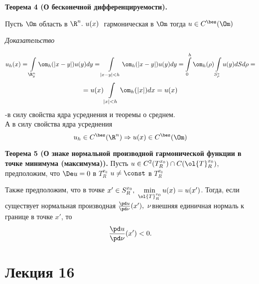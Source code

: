 \documentclass[a4paper,draft]{article}
\begin{document}
\textbf{Теорема 4 (О бесконечной дифференцируемости).}

Пусть $\Om$ область в $\R^n.\ u(x)\ $ гармоническая в $\Om$
тогда $u\in C^\bes(\Om)$

\textit{Доказательство}

$$
u_h(x)=\int\limits_{\R_y^n}\om_h(|x-y|)u(y)dy=
\int\limits_{|x-y|<h}\om_h(|x-y|)u(y)dy=
\int\limits_0^h\om_h(\rho)\int\limits_{S_\rho^x}u(y)dSd\rho=
$$
$$
=u(x)\int\limits_{|x|<h}\om_h(|x|)dx=u(x)
$$
-в силу свойства ядра усреднения и теоремы о среднем.\\
А в силу свойства ядра усреднения
$$
u_h\in C^\bes(\R^n)\Rightarrow u(x)\in C^\bes(\Om)
$$

\textbf{Теорема 5 (О знаке нормальной производной гармонической функции в точке минимума (максимума)).}
Пусть $u\in C^2(T_R^{x_0})\cap C(\ol{T}_R^{x_0})$, предположим, что $\De u=0$ в $T_R^{x_0}$
$u\neq \const$ в $T_R^{x_0}$

Также предположим, что в точке $x'\in S_R^{x_0},\ \min\limits_{\ol{T}_R^{x_0}}u(x)=u(x')$.
Тогда, если существует нормальная производная $\frac{\pd u}{\pd \nu}(x'),\ \nu$\т внешняя единичная
нормаль к границе в точке $x'$, то
$$\frac{\pd u}{\pd \nu}(x')<0.$$



\section{Лекция 16}
\end{document}

